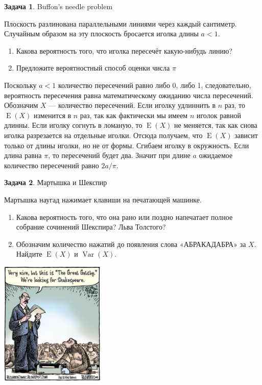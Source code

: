 \documentclass[nobib]{tufte-handout}
\theoremstyle{definition}
\newtheorem{problem}{Задача}
\DeclareMathOperator{\Var}{Var}
\DeclareMathOperator{\E}{E}
\begin{document}
\begin{problem}
Buffon's needle problem

Плоскость разлинована параллельными линиями через каждый сантиметр. Случайным образом на эту плоскость бросается иголка длины $a<1$.

\begin{enumerate}
\item Какова вероятность того, что иголка пересечёт какую-нибудь линию?
\item Предложите вероятностный способ оценки числа $\pi$
\end{enumerate}

\begin{sol}
Поскольку $a<1$ количество пересечений равно либо 0, либо 1, следовательно, вероятность пересечения равна математическому ожиданию числа пересечений. Обозначим $X$ — количество пересечений. Если иголку удлиннить в $n$ раз, то $\E(X)$ изменится в $n$ раз, так как фактически мы имеем $n$ иголок равной длинны. Если иголку согнуть в ломаную, то $\E(X)$ не меняется, так как снова иголка разрезается на отдельные иголки. Отсюда получаем, что $\E(X)$ зависит только от длины иголки, но не от формы. Сгибаем иголку в окружность. Если длина равна $\pi$, то пересечений будет два. Значит при длине $a$ ожидаемое количество пересечений равно $2a/\pi$.
\end{sol}


\end{problem}


\begin{problem}
Мартышка и Шекспир

Мартышка наугад нажимает клавиши на печатающей машинке.


\begin{enumerate}
\item Какова вероятность того, что она рано или поздно напечатает полное собрание сочинений Шекспира? Льва Толстого?
\item Обозначим количество нажатий до появления слова «АБРАКАДАБРА» за $X$. Найдите $\E(X)$ и $\Var(X)$.
\end{enumerate}


\begin{marginfigure}
  \includegraphics[width=5cm]{images/gatsby}
  \caption{Задача о «бесконечных обезьянах», infinte-monkey problem. }
\end{marginfigure}

\end{problem}
\end{document}
